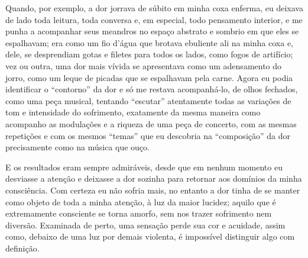 Quando, por exemplo, a dor jorrava de súbito em minha coxa enferma, eu
deixava de lado toda leitura, toda conversa e, em especial, todo
pensamento interior, e me punha a acompanhar seus meandros no espaço
abstrato e sombrio em que eles se espalhavam; era como um fio d'água que
brotava ebuliente ali na minha coxa e, dele, se desprendiam gotas e
filetes para todos os lados, como fogos de artifício; vez ou outra,
uma dor mais vívida se apresentava como um adensamento do jorro, como um
leque de picadas que se espalhavam pela carne. Agora eu podia
identificar o ``contorno'' da dor e só me restava acompanhá-lo, de olhos
fechados, como uma peça musical, tentando ``escutar'' atentamente todas
as variações de tom e intensidade do sofrimento, exatamente da mesma
maneira como acompanho as modulações e a riqueza de uma peça de
concerto, com as mesmas repetições e com os mesmos ``temas'' que eu
descobria na ``composição'' da dor precisamente como na música que ouço.


E os resultados eram sempre admiráveis, desde que em nenhum momento eu
desviasse a atenção e deixasse a dor sozinha para retornar aos domínios
da minha consciência. Com certeza eu não sofria mais, no entanto a dor
tinha de se manter como objeto de toda a minha atenção, à luz da maior
lucidez; aquilo que é extremamente consciente se torna amorfo, sem nos
trazer sofrimento nem diversão. Examinada de perto, uma sensação perde
sua cor e acuidade, assim como, debaixo de uma luz por demais violenta,
é impossível distinguir algo com definição.



